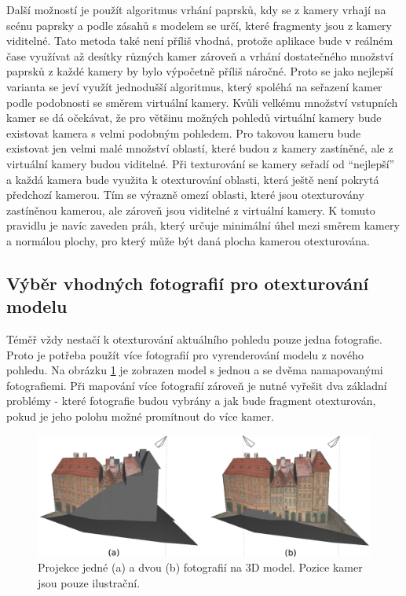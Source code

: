 \documentclass[11pt,twoside,a4paper]{book}
\begin{document}
Další možností je použít algoritmus vrhání paprsků, kdy se z kamery vrhají na scénu paprsky a podle zásahů s modelem se určí, které fragmenty jsou z kamery viditelné. Tato metoda také není příliš vhodná, protože aplikace bude v reálném čase využívat až desítky různých kamer zároveň a vrhání dostatečného množství paprsků z každé kamery by bylo výpočetně příliš náročné. Proto se jako nejlepší varianta se jeví využít jednodušší algoritmus, který spoléhá na seřazení kamer podle podobnosti se směrem virtuální kamery. Kvůli velkému množství vstupních kamer se dá očekávat, že pro většinu možných pohledů virtuální kamery bude existovat kamera s velmi podobným pohledem. Pro takovou kameru bude existovat jen velmi malé množství oblastí, které budou z kamery zastíněné, ale z virtuální kamery budou viditelné. Při texturování se kamery seřadí od ``nejlepší'' a každá kamera bude využita k otexturování oblasti, která ještě není pokrytá předchozí kamerou. Tím se výrazně omezí oblasti, které jsou otexturovány zastíněnou kamerou, ale zároveň jsou viditelné z virtuální kamery. K tomuto pravidlu je navíc zaveden práh, který určuje minimální úhel mezi směrem kamery a normálou plochy, pro který může být daná plocha kamerou otexturována. 


\subsection{Výběr vhodných fotografií pro otexturování modelu}
\label{sec:photo-choosing}

Téměř vždy nestačí k otexturování aktuálního pohledu pouze jedna fotografie. Proto je potřeba použít více fotografií pro vyrenderování modelu z nového pohledu. Na obrázku \ref{fig:dum-1} je zobrazen model s jednou a se dvěma namapovanými fotografiemi.  Při mapování více fotografií zároveň je nutné vyřešit dva základní problémy - které fotografie budou vybrány a jak bude fragment otexturován, pokud je jeho polohu možné promítnout do více kamer.

\begin{figure}[bh]
\begin{center}
\includegraphics[width=\textwidth]{figures/dum-1}
\caption{Projekce jedné (a) a dvou (b) fotografií na 3D model. Pozice kamer jsou pouze ilustrační.}
\label{fig:dum-1}
\end{center}
\end{figure}
\end{document}
